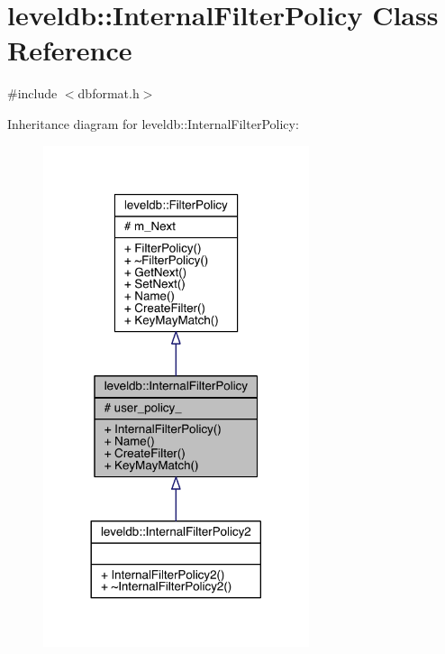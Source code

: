 \hypertarget{classleveldb_1_1_internal_filter_policy}{}\section{leveldb\+:\+:Internal\+Filter\+Policy Class Reference}
\label{classleveldb_1_1_internal_filter_policy}


{\ttfamily \#include $<$dbformat.\+h$>$}



Inheritance diagram for leveldb\+:\+:Internal\+Filter\+Policy\+:\nopagebreak
\begin{figure}[H]
\begin{center}
\leavevmode
\includegraphics[width=221pt]{classleveldb_1_1_internal_filter_policy__inherit__graph}
\end{center}
\end{figure}


